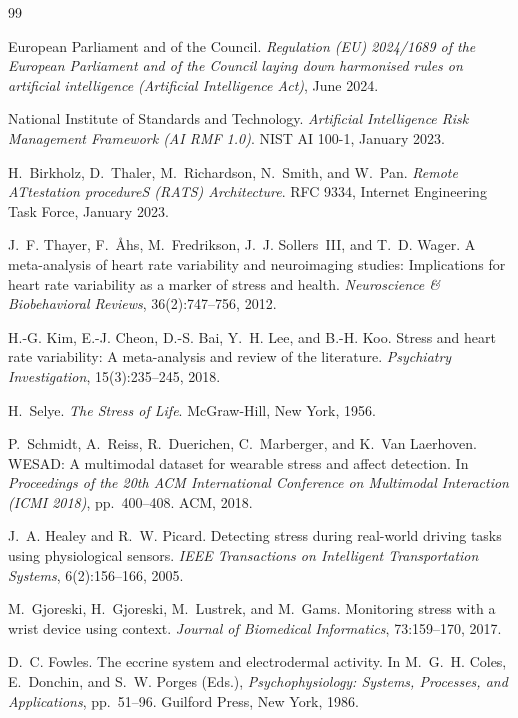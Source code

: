 \documentclass[12pt,a4paper]{article}
\begin{document}
\begin{thebibliography}{99}

European Parliament and of the Council.
\textit{Regulation (EU) 2024/1689 of the European Parliament and of the
Council laying down harmonised rules on artificial intelligence (Artificial
Intelligence Act)}, June 2024.

National Institute of Standards and Technology.
\textit{Artificial Intelligence Risk Management Framework (AI RMF 1.0)}.
NIST AI 100-1, January 2023.

H.~Birkholz, D.~Thaler, M.~Richardson, N.~Smith, and W.~Pan.
\textit{Remote ATtestation procedureS (RATS) Architecture}.
RFC 9334, Internet Engineering Task Force, January 2023.

J.~F. Thayer, F.~\AA{}hs, M.~Fredrikson, J.~J. Sollers~III, and T.~D. Wager.
A meta-analysis of heart rate variability and neuroimaging studies: Implications
for heart rate variability as a marker of stress and health.
\textit{Neuroscience \& Biobehavioral Reviews}, 36(2):747--756, 2012.

H.-G. Kim, E.-J. Cheon, D.-S. Bai, Y.~H. Lee, and B.-H. Koo.
Stress and heart rate variability: A meta-analysis and review of the literature.
\textit{Psychiatry Investigation}, 15(3):235--245, 2018.

H.~Selye.
\textit{The Stress of Life}.
McGraw-Hill, New York, 1956.

P.~Schmidt, A.~Reiss, R.~Duerichen, C.~Marberger, and K.~Van Laerhoven.
{WESAD}: A multimodal dataset for wearable stress and affect detection.
In \textit{Proceedings of the 20th ACM International Conference on Multimodal
Interaction (ICMI 2018)}, pp.~400--408. ACM, 2018.

J.~A. Healey and R.~W. Picard.
Detecting stress during real-world driving tasks using physiological sensors.
\textit{IEEE Transactions on Intelligent Transportation Systems},
6(2):156--166, 2005.

M.~Gjoreski, H.~Gjoreski, M.~Lustrek, and M.~Gams.
Monitoring stress with a wrist device using context.
\textit{Journal of Biomedical Informatics}, 73:159--170, 2017.

D.~C. Fowles.
The eccrine system and electrodermal activity.
In M.~G.~H. Coles, E.~Donchin, and S.~W. Porges (Eds.),
\textit{Psychophysiology: Systems, Processes, and Applications},
pp.~51--96. Guilford Press, New York, 1986.


\end{thebibliography}
\end{document}
